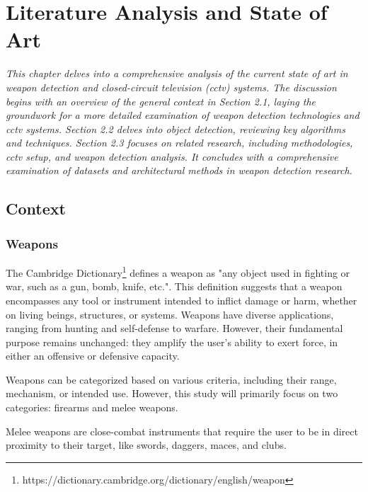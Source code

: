
\renewcommand{\arraystretch}{2}
\renewcommand{\figurename}{Figure}
\chapter{Literature Analysis and State of Art}
\label{chapter:literarure}

\newenvironment{literature}
{\quote\itshape}
{\endquote}

\begin{literature}
This chapter delves into a comprehensive analysis of the current state of art in weapon detection and closed-circuit television (\ac{cctv}) systems. The discussion begins with an overview of the general context in Section 2.1, laying the groundwork for a more detailed examination of weapon detection technologies and \ac{cctv} systems. Section 2.2 delves into object detection, reviewing key algorithms and techniques. Section 2.3 focuses on related research, including methodologies, \ac{cctv} setup, and weapon detection analysis. It concludes with a comprehensive examination of datasets and architectural methods in weapon detection research.
\end{literature}

\section{Context}
\subsection{Weapons}
The Cambridge Dictionary\footnote{https://dictionary.cambridge.org/dictionary/english/weapon} defines a weapon as "any object used in fighting or war, such as a gun, bomb, knife, etc.". This definition suggests that a weapon encompasses any tool or instrument intended to inflict damage or harm, whether on living beings, structures, or systems. Weapons have diverse applications, ranging from hunting and self-defense to warfare. However, their fundamental purpose remains unchanged: they amplify the user's ability to exert force, in either an offensive or defensive capacity.

Weapons can be categorized based on various criteria, including their range, mechanism, or intended use. However, this study will primarily focus on two categories: firearms and melee weapons.

Melee weapons are close-combat instruments that require the user to be in direct proximity to their target, like swords, daggers, maces, and clubs.

